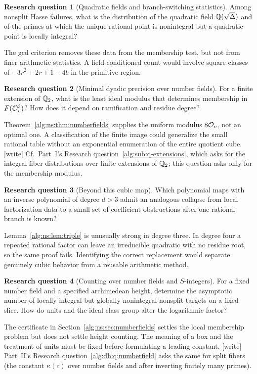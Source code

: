 \documentclass[11pt]{article}
\numberwithin{equation}{section}
\theoremstyle{plain}
\theoremstyle{plain}
\theoremstyle{plain}
\theoremstyle{definition}
\theoremstyle{definition}
\newtheorem{question}[question]{Research question}
\theoremstyle{definition}
\theoremstyle{remark}
\newcommand{\wtag}{\textup{[write]}}%
\begin{document}
\begin{question}[Quadratic fields and branch-switching statistics]\label{alg:ns:q:quadfields}
Among nonsplit Hasse failures, what is the distribution of the quadratic
field $\mathbb Q(\sqrt\Delta)$ and of the primes at which the unique rational
point is nonintegral but a quadratic point is locally integral?
\end{question}
The gcd criterion removes these data from the membership test, but not
from finer arithmetic statistics. A field-conditioned count would
involve square classes of $-3r^2+2r+1-4b$ in the primitive region.

\begin{question}[Minimal dyadic precision over number fields]\label{alg:ns:q:dyadicprec}
For a finite extension of $\mathbb Q_2$, what is the least ideal modulus that
determines membership in $F(\mathcal O_v^3)$? How does it depend on ramification
and residue degree?
\end{question}
Theorem~\ref{alg:ns:thm:numberfields} supplies the uniform modulus $8\mathcal O_v$,
not an optimal one. A classification of the finite image could generalize
the small rational table without an exponential enumeration of the
entire quotient cube.
\wtag{} Cf.\ Part~I's Research question~\ref{alg:sub:q-extensions},
which asks for the integral fiber distributions over finite extensions
of $\mathbb Q_2$; this question asks only for the membership modulus.

\begin{question}[Beyond this cubic map]\label{alg:ns:q:beyond}
Which polynomial maps with an inverse polynomial of degree $d>3$ admit
an analogous collapse from local factorization data to a small set of
coefficient obstructions after one rational branch is known?
\end{question}
Lemma~\ref{alg:ns:lem:triple} is unusually strong in degree three. In degree
four a repeated rational factor can leave an irreducible quadratic with
no residue root, so the same proof fails. Identifying the correct
replacement would separate genuinely cubic behavior from a reusable
arithmetic method.

\begin{question}[Counting over number fields and $S$-integers]\label{alg:ns:q:numberfield}
For a fixed number field and a specified archimedean height, determine
the asymptotic number of locally integral but globally nonintegral
nonsplit targets on a fixed slice. How do units and the ideal class group
alter the logarithmic factor?
\end{question}
The certificate in Section~\ref{alg:ns:sec:numberfields} settles the local
membership problem but does not settle height counting. The meaning of
a box and the treatment of units must be fixed before formulating a
leading constant.
\wtag{} Part~II's Research question~\ref{alg:dh:q:numberfield} asks the
same for split fibers (the constant $\kappa(c)$ over number fields and
after inverting finitely many primes).
\end{document}
